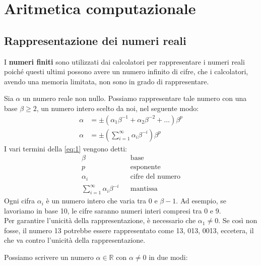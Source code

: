 \documentclass{article}
\begin{document}
\thispagestyle{empty}
\setcounter{page}{0}
\tableofcontents
\newpage

\section{Aritmetica computazionale}
\subsection{Rappresentazione dei numeri reali}
I \textbf{numeri finiti} sono utilizzati dai calcolatori per rappresentare i numeri reali poiché
questi ultimi possono avere un numero infinito di cifre, che i calcolatori, avendo una
memoria limitata, non sono in grado di rappresentare. 

\begin{theorem}
    Sia $\alpha$ un numero reale non nullo. Possiamo rappresentare tale numero con una base
    $\beta\geq 2$, un numero intero scelto da noi, nel seguente modo:
    \begin{equation} \label{eq:1}
        \begin{aligned}
            \alpha&=\pm(\alpha_1\beta^{-1}+\alpha_2\beta^{-2}+\ldots)\beta^p \\ 
            \alpha&=\pm(\sum_{i=1}^{\infty}\alpha_i\beta^{-i})\beta^p
        \end{aligned}
    \end{equation}
    I vari termini della \ref{eq:1} vengono detti:
    $$\begin{array}{lll}
        \beta & & \text{base} \\ 
        p & & \text{esponente} \\ 
        \alpha_i & & \text{cifre del numero} \\
        \sum_{i=1}^{\infty}\alpha_i\beta^{-i} & & \text{mantissa}
    \end{array}$$
    Ogni cifra $\alpha_i$ è un numero intero che varia tra 0 e $\beta-1$. Ad esempio, se lavoriamo in base
    10, le cifre saranno numeri interi compresi tra 0 e 9.\\ 
    Per garantire l'unicità della rappresentazione, è necessario che $\alpha_1\neq 0$. 
    Se così non fosse, il numero 13 potrebbe essere rappresentato come 13, 013, 0013, eccetera,
    il che va contro l'unicità della rappresentazione.
\end{theorem}
Possiamo scrivere un numero $\alpha\in\mathbb{R}$ con $\alpha\neq 0$ in due modi:
\end{document}
